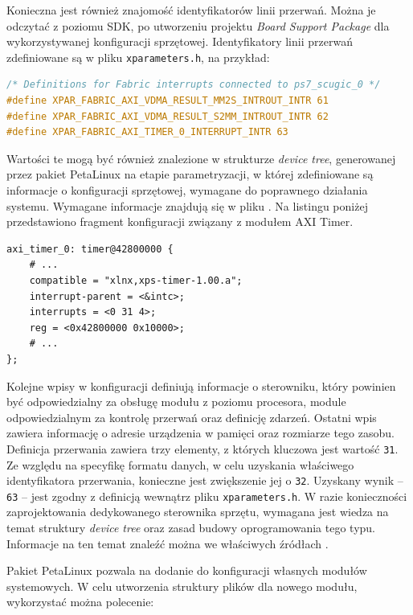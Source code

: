 Konieczna jest również znajomość identyfikatorów linii przerwań. 
Można je odczytać z poziomu SDK, po utworzeniu projektu \emph{Board Support Package} dla wykorzystywanej konfiguracji sprzętowej. 
Identyfikatory linii przerwań zdefiniowane są w pliku \texttt{xparameters.h}, na przykład:

\begin{lstlisting}[language=C]
/* Definitions for Fabric interrupts connected to ps7_scugic_0 */
#define XPAR_FABRIC_AXI_VDMA_RESULT_MM2S_INTROUT_INTR 61
#define XPAR_FABRIC_AXI_VDMA_RESULT_S2MM_INTROUT_INTR 62
#define XPAR_FABRIC_AXI_TIMER_0_INTERRUPT_INTR 63
\end{lstlisting}

Wartości te mogą być również znalezione w strukturze \textit{device tree}, generowanej przez pakiet PetaLinux na etapie parametryzacji, w której zdefiniowane są informacje o konfiguracji sprzętowej, wymagane do poprawnego działania systemu.
Wymagane informacje znajdują się w pliku . 
Na listingu poniżej przedstawiono fragment konfiguracji związany z modułem AXI Timer.

\begin{lstlisting}
axi_timer_0: timer@42800000 {
	# ...
	compatible = "xlnx,xps-timer-1.00.a";
	interrupt-parent = <&intc>;
	interrupts = <0 31 4>;
	reg = <0x42800000 0x10000>;
	# ...
};
\end{lstlisting}
Kolejne wpisy w konfiguracji definiują informacje o sterowniku, który powinien być odpowiedzialny za obsługę modułu z poziomu procesora, module odpowiedzialnym za kontrolę przerwań oraz definicję zdarzeń. 
Ostatni wpis zawiera informację o adresie urządzenia w pamięci oraz rozmiarze tego zasobu.
Definicja przerwania zawiera trzy elementy, z których kluczowa jest wartość \texttt{31}. 
Ze względu na specyfikę formatu danych, w celu uzyskania właściwego identyfikatora przerwania, konieczne jest zwiększenie jej o \texttt{32}. Uzyskany wynik -- \texttt{63} -- jest zgodny z definicją wewnątrz pliku \texttt{xparameters.h}.
W razie konieczności zaprojektowania dedykowanego sterownika sprzętu, wymagana jest wiedza na temat struktury \textit{device tree} oraz zasad budowy oprogramowania tego typu. 
Informacje na ten temat znaleźć można we właściwych źródłach \cite{Corbet2005,device-tree-tutorial}.

Pakiet PetaLinux pozwala na dodanie do konfiguracji własnych modułów systemowych. 
W celu utworzenia struktury plików dla nowego modułu, wykorzystać można polecenie:

